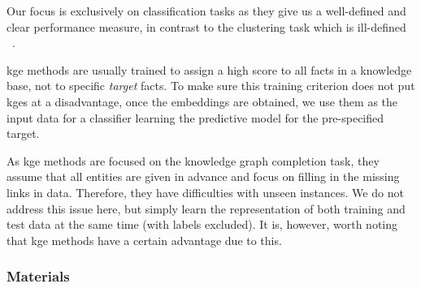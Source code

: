 Our focus is exclusively on classification tasks as they give us a well-defined and clear performance measure, in contrast to the clustering task which is ill-defined ~\cite{Estivill-Castro:2002}.






\gls{kge} methods are usually trained to assign a high score to all facts in a knowledge base, not to specific \textit{target} facts.
To make sure this training criterion does not put \gls{kge}s at a disadvantage, once the embeddings are obtained, we use them as the input data for a classifier learning the predictive model for the pre-specified target.



As \gls{kge} methods are focused on the knowledge graph completion task, they assume that all entities are given in advance and focus on filling in the missing links in data.
Therefore, they have difficulties with unseen instances.
We do not address this issue here, but simply learn the representation of both training and test data at the same time (with labels excluded).
It is, however, worth noting that \gls{kge} methods have a certain advantage due to this.




\subsubsection{Materials}



